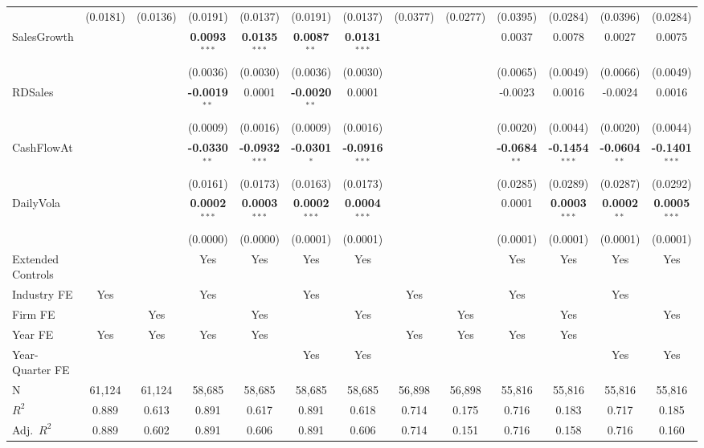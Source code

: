 \begin{landscape}
\begin{table}[H]
\begin{tabular}{lcccccccccccc}
 & (0.0181) & (0.0136) & (0.0191) & (0.0137) & (0.0191) & (0.0137) & (0.0377) & (0.0277) & (0.0395) & (0.0284) & (0.0396) & (0.0284) \\
SalesGrowth &  &  & \textbf{0.0093}$^{***}$ & \textbf{0.0135}$^{***}$ & \textbf{0.0087}$^{**}$ & \textbf{0.0131}$^{***}$ &  &  & 0.0037 & 0.0078 & 0.0027 & 0.0075 \\
 &  &  & (0.0036) & (0.0030) & (0.0036) & (0.0030) &  &  & (0.0065) & (0.0049) & (0.0066) & (0.0049) \\
RDSales &  &  & \textbf{-0.0019}$^{**}$ & 0.0001 & \textbf{-0.0020}$^{**}$ & 0.0001 &  &  & -0.0023 & 0.0016 & -0.0024 & 0.0016 \\
 &  &  & (0.0009) & (0.0016) & (0.0009) & (0.0016) &  &  & (0.0020) & (0.0044) & (0.0020) & (0.0044) \\
CashFlowAt &  &  & \textbf{-0.0330}$^{**}$ & \textbf{-0.0932}$^{***}$ & \textbf{-0.0301}$^{*}$ & \textbf{-0.0916}$^{***}$ &  &  & \textbf{-0.0684}$^{**}$ & \textbf{-0.1454}$^{***}$ & \textbf{-0.0604}$^{**}$ & \textbf{-0.1401}$^{***}$ \\
 &  &  & (0.0161) & (0.0173) & (0.0163) & (0.0173) &  &  & (0.0285) & (0.0289) & (0.0287) & (0.0292) \\
DailyVola &  &  & \textbf{0.0002}$^{***}$ & \textbf{0.0003}$^{***}$ & \textbf{0.0002}$^{***}$ & \textbf{0.0004}$^{***}$ &  &  & 0.0001 & \textbf{0.0003}$^{***}$ & \textbf{0.0002}$^{**}$ & \textbf{0.0005}$^{***}$ \\
 &  &  & (0.0000) & (0.0000) & (0.0001) & (0.0001) &  &  & (0.0001) & (0.0001) & (0.0001) & (0.0001) \\
\midrule
Extended Controls &  &  & Yes & Yes & Yes & Yes &  &  & Yes & Yes & Yes & Yes \\
Industry FE & Yes &  & Yes &  & Yes &  & Yes &  & Yes &  & Yes &  \\
Firm FE &  & Yes &  & Yes &  & Yes &  & Yes &  & Yes &  & Yes \\
Year FE & Yes & Yes & Yes & Yes &  &  & Yes & Yes & Yes & Yes &  &  \\
Year-Quarter FE &  &  &  &  & Yes & Yes &  &  &  &  & Yes & Yes \\
\midrule
N & 61,124 & 61,124 & 58,685 & 58,685 & 58,685 & 58,685 & 56,898 & 56,898 & 55,816 & 55,816 & 55,816 & 55,816 \\
$R^2$ & 0.889 & 0.613 & 0.891 & 0.617 & 0.891 & 0.618 & 0.714 & 0.175 & 0.716 & 0.183 & 0.717 & 0.185 \\
Adj.~$R^2$ & 0.889 & 0.602 & 0.891 & 0.606 & 0.891 & 0.606 & 0.714 & 0.151 & 0.716 & 0.158 & 0.716 & 0.160 \\

\end{tabular}
\end{table}
\end{landscape}
